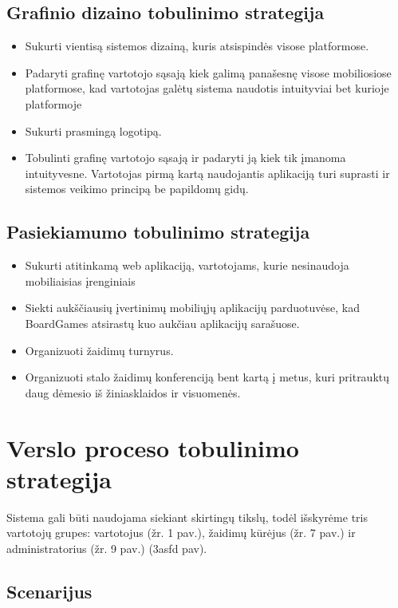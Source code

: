 \documentclass{VUMIFPSkursinis}
\begin{document}
	\subsection {Grafinio dizaino tobulinimo strategija}
		\renewcommand{\labelitemi}{$\bullet$}
			\begin{itemize}
				\item Sukurti vientisą sistemos dizainą, kuris atsispindės visose platformose.
				\item Padaryti grafinę vartotojo sąsają kiek galimą panašesnę visose mobiliosiose platformose, kad vartotojas galėtų sistema naudotis intuityviai bet kurioje platformoje
				\item Sukurti prasmingą logotipą.
				\item Tobulinti grafinę vartotojo sąsają ir padaryti ją kiek tik įmanoma intuityvesne. Vartotojas pirmą kartą naudojantis aplikaciją turi suprasti ir sistemos veikimo principą be papildomų gidų. 
			\end{itemize}		
	\subsection {Pasiekiamumo tobulinimo strategija}
		\renewcommand{\labelitemi}{$\bullet$}
			\begin{itemize}
				\item Sukurti atitinkamą web aplikaciją, vartotojams, kurie nesinaudoja mobiliaisias įrenginiais
				\item Siekti aukščiausių įvertinimų mobiliųjų aplikacijų parduotuvėse, kad BoardGames atsirastų kuo aukčiau aplikacijų sarašuose.
				\item Organizuoti žaidimų turnyrus.
				\item Organizuoti stalo žaidimų konferenciją bent kartą į metus, kuri pritrauktų daug dėmesio iš žiniasklaidos ir visuomenės. 
			\end{itemize}			
\section{Verslo proceso tobulinimo strategija}
Sistema gali būti naudojama siekiant skirtingų tikslų, todėl išskyrėme tris 
vartotojų grupes: vartotojus (žr. 1 pav.), žaidimų kūrėjus (žr. 7 pav.) ir administratorius (žr. 9 pav.)
(3asfd pav).
	\subsection {Scenarijus}
\end{document}
